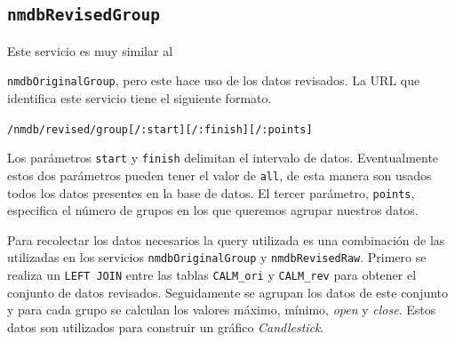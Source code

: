 	\subsection{\texttt{nmdbRevisedGroup}}
		Este servicio es muy similar al {\texttt{nmdbOriginalGroup}, pero este hace uso de los datos revisados. La URL que identifica este
		servicio tiene el siguiente formato.
			\begin{center} \texttt{/nmdb/revised/group[/:start][/:finish][/:points]}  \end{center}
		Los parámetros \texttt{start} y \texttt{finish} delimitan el intervalo de datos. Eventualmente estos dos parámetros pueden tener el
		valor de \texttt{all}, de esta manera son usados todos los datos presentes en la base de datos. El tercer parámetro, \texttt{points},
		especifica el número de grupos en los que queremos agrupar nuestros datos.
		\par
		Para recolectar los datos necesarios la query utilizada es una combinación de las utilizadas en los servicios
		\texttt{nmdbOriginalGroup} y \texttt{nmdbRevisedRaw}. Primero se realiza un \texttt{LEFT JOIN} entre las tablas \texttt{CALM\_ori} y
		\texttt{CALM\_rev} para obtener el conjunto de datos revisados. Seguidamente se agrupan los datos de este conjunto y para cada grupo
		se calculan los valores máximo, mínimo, \emph{open} y \emph{close}. Estos datos son utilizados para construir un gráfico
		\emph{Candlestick}.
}
